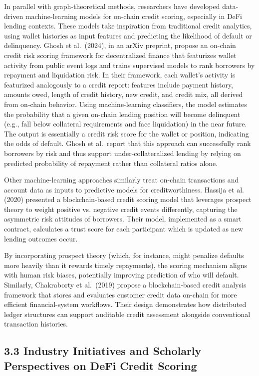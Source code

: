 In parallel with graph-theoretical methods, researchers have developed data-driven machine-learning models for on-chain credit scoring, especially in DeFi lending contexts. These models take inspiration from traditional credit analytics, using wallet histories as input features and predicting the likelihood of default or delinquency. Ghosh et al.\ (2024), in an arXiv preprint, propose an on-chain credit risk scoring framework for decentralized finance that featurizes wallet activity from public event logs and trains supervised models to rank borrowers by repayment and liquidation risk. In their framework, each wallet's activity is featurized analogously to a credit report: features include payment history, amounts owed, length of credit history, new credit, and credit mix, all derived from on-chain behavior. Using machine-learning classifiers, the model estimates the probability that a given on-chain lending position will become delinquent (e.g., fall below collateral requirements and face liquidation) in the near future. The output is essentially a credit risk score for the wallet or position, indicating the odds of default. Ghosh et al.\ report that this approach can successfully rank borrowers by risk and thus support under-collateralized lending by relying on predicted probability of repayment rather than collateral ratios alone.


Other machine-learning approaches similarly treat on-chain transactions and account data as inputs to predictive models for creditworthiness. Hassija et al. (2020) presented a blockchain-based credit scoring model that leverages prospect theory to weight positive vs. negative credit events differently, capturing the asymmetric risk attitudes of borrowers. Their model, implemented as a smart contract, calculates a trust score for each participant which is updated as new lending outcomes occur.


By incorporating prospect theory (which, for instance, might penalize defaults more heavily than it rewards timely repayments), the scoring mechanism aligns with human risk biases, potentially improving prediction of who will default. Similarly, Chakraborty et al.\ (2019) propose a blockchain-based credit analysis framework that stores and evaluates customer credit data on-chain for more efficient financial-system workflows. Their design demonstrates how distributed ledger structures can support auditable credit assessment alongside conventional transaction histories.


\subsection*{3.3 Industry Initiatives and Scholarly Perspectives on DeFi Credit Scoring}
\label{sec:industry-initiatives-and-non-scholarly-perspectives}

